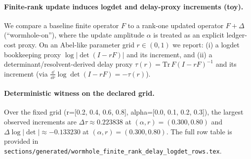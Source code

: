 \paragraph{Finite-rank update induces logdet and delay-proxy increments (toy).} \AuditTag We compare a baseline finite operator $F$ to a rank-one updated operator $F+\Delta$ (``wormhole-on''), where the update amplitude $\alpha$ is treated as an explicit ledger-cost proxy. On an Abel-like parameter grid $r\in(0,1)$ we report: (i) a logdet bookkeeping proxy $\log|\det(I-rF)|$ and its increment, and (ii) a determinant/resolvent-derived delay proxy $\tau(r)=\mathrm{Tr}\,F(I-rF)^{-1}$ and its increment (via $\frac{\dd}{\dd r}\log\det(I-rF)=-\tau(r)$).
\paragraph{Deterministic witness on the declared grid.} \AuditTag Over the fixed grid (r=[0.2, 0.4, 0.6, 0.8], alpha=[0.0, 0.1, 0.2, 0.3]), the largest observed increments are $\Delta\tau\approx 0.223838$ at $(\alpha,r)=(0.300,0.80)$ and $\Delta\log|\det|\approx -0.133230$ at $(\alpha,r)=(0.300,0.80)$. The full row table is provided in \texttt{sections/generated/wormhole\_finite\_rank\_delay\_logdet\_rows.tex}.